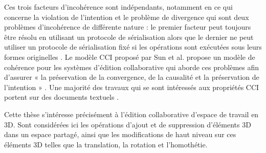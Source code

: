 Ces trois facteurs d'incohérence sont indépendants, notamment en ce qui concerne la violation de l'intention et le problème de 
divergence qui sont deux problèmes d'incohérence de différente nature : 
le premier facteur peut toujours être résolu en utilisant un protocole de sérialisation 
alors que le dernier ne peut utiliser un protocole de sérialisation fixé si les 
opérations sont exécutées sous leurs formes originelles \cite{Sun1997}. 
Le modèle \gls{CCI} proposé par Sun et al. \cite{Sun1998} propose un modèle de 
cohérence pour les systèmes d’édition collaborative qui aborde ces problèmes
afin d'assurer « la préservation 
de la convergence, de la causalité et la préservation de l’intention » 
\cite{Sun1998}. Une majorité des travaux qui se sont intéressés aux propriétés \gls{CCI} portent sur des documents textuels \cite{Weiss2010}. 

Cette thèse s’intéresse précisément à l’édition collaborative d’espace de travail en 
3D. 
Sont considérées ici les opérations d’ajout et de suppression d’éléments \gls{3D} 
dans un espace partagé, 
ainsi que les modifications de haut niveau sur ces éléments \gls{3D} telles que la 
translation, la rotation et l’homothétie.

%
%
%

